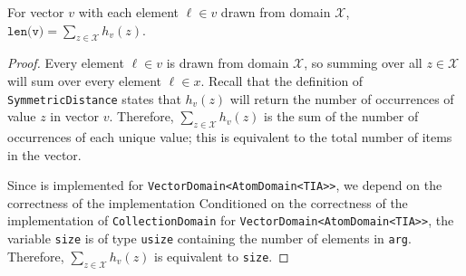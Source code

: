 \documentclass{article}
\begin{document}
\begin{lemma}
    \label{lemma:len-sum-equiv}
    For vector $v$ with each element $\ell\in v$ drawn from domain $\mathcal{X}$, $\texttt{len(v)} = \sum_{z\in\mathcal{X}} h_v(z)$.
\end{lemma}

\begin{proof}
    Every element $\ell \in v$ is drawn from domain $\mathcal{X}$, so summing over all $z\in \mathcal{X}$ will sum over every element $\ell\in x$. 
    Recall that the definition of \texttt{SymmetricDistance} states that $h_v(z)$ will return the number of occurrences of value $z$ in vector $v$.
    Therefore, $\sum_{z\in\mathcal{X}} h_v(z)$ is the sum of the number of occurrences of each unique value; 
    this is equivalent to the total number of items in the vector. 

    Since  is implemented for \texttt{VectorDomain<AtomDomain<TIA>>}, 
    we depend on the correctness of the implementation 
    Conditioned on the correctness of the implementation of \texttt{CollectionDomain} for \texttt{VectorDomain<AtomDomain<TIA>>},
    the variable \texttt{size} is of type \texttt{usize} containing the number of elements in \texttt{arg}.
    Therefore, $\sum_{z\in\mathcal{X}} h_v(z)$ is equivalent to \texttt{size}.
\end{proof}
\end{document}
